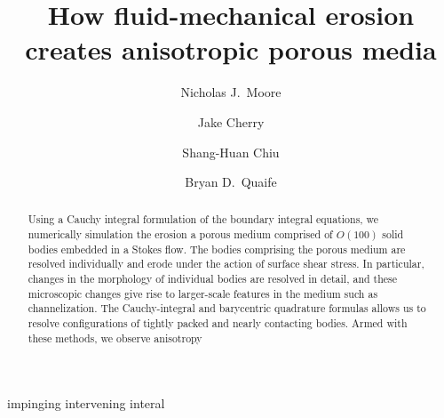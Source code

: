 \documentclass[3p]{elsarticle}
\begin{document}
\title{How fluid-mechanical erosion creates anisotropic porous media}



\author[Colgate]{Nicholas J.~Moore}

\author[FSU]{Jake Cherry}

\author[NJIT]{Shang-Huan Chiu}

\author[FSU]{Bryan D.~Quaife}

\address[Colgate]{Colgate University}
\address[FSU]{Florida State University}
\address[NJIT]{New Jersey Institute of Technology}

\begin{abstract}
Using a Cauchy integral formulation of the boundary integral equations, we numerically simulation the erosion a porous medium comprised of $O(100)$ solid bodies embedded in a Stokes flow. The bodies comprising the porous medium are resolved individually and erode under the action of surface shear stress. In particular, changes in the morphology of individual bodies are resolved in detail, and these microscopic changes give rise to larger-scale features in the medium such as channelization. The Cauchy-integral and barycentric quadrature formulas allows us to resolve configurations of tightly packed and nearly contacting bodies. Armed with these methods, we observe anisotropy 
\end{abstract}
\maketitle

impinging intervening interal

\end{document}
